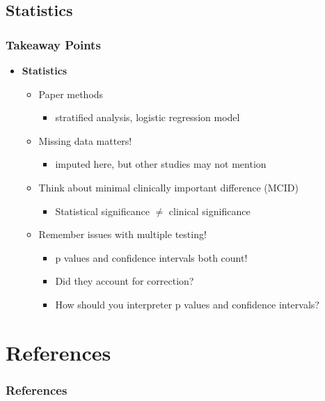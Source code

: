 \documentclass{beamer}
\begin{document}
	\subsection{Statistics}
\begin{frame}
	\frametitle{Takeaway Points}
	\begin{itemize}
		\item \textbf{Statistics}
		\begin{itemize}
			\item Paper methods
				\begin{itemize}
					\item stratified analysis, logistic regression model
				\end{itemize}
			\item Missing data matters!
				\begin{itemize}
					\item imputed here, but other studies may not mention
				\end{itemize}
			\item Think about minimal clinically important difference (MCID)
				\begin{itemize}
					\item Statistical significance $\neq$ clinical significance
				\end{itemize}
			\item Remember issues with multiple testing!
				\begin{itemize}
					\item p values and confidence intervals both count!
					\item Did they account for correction?
					\item How should you interpreter p values and confidence intervals?
				\end{itemize}
		\end{itemize}
	\end{itemize}
\end{frame}
\section{References}
	\begin{frame}
		\frametitle{References}
		\printbibliography
	\end{frame}
\end{document}
